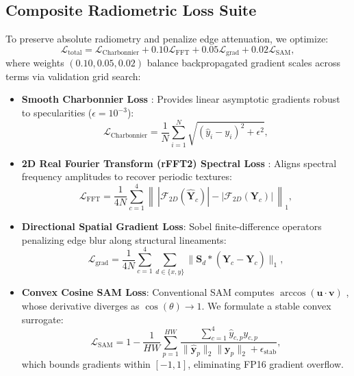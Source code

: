 \documentclass[letterpaper,journal,twoside]{IEEEtran}
\begin{document}
\subsection{Composite Radiometric Loss Suite}
To preserve absolute radiometry and penalize edge attenuation, we optimize:
\begin{equation}
\mathcal{L}_{\text{total}} = \mathcal{L}_{\text{Charbonnier}} + 0.10 \mathcal{L}_{\text{FFT}} + 0.05 \mathcal{L}_{\text{grad}} + 0.02 \mathcal{L}_{\text{SAM}},
\label{eq:total_loss}
\end{equation}
where weights $(0.10, 0.05, 0.02)$ balance backpropagated gradient scales across terms via validation grid search:
\begin{itemize}[leftmargin=*,itemsep=0.8pt,topsep=1.0pt,parsep=0pt]
    \item \textbf{Smooth Charbonnier Loss} \cite{charbonnier1997deterministic}: Provides linear asymptotic gradients robust to specularities ($\epsilon = 10^{-3}$):
    \begin{equation}
    \mathcal{L}_{\text{Charbonnier}} = \frac{1}{N} \sum_{i=1}^N \sqrt{(\hat{y}_i - y_i)^2 + \epsilon^2},
    \label{eq:charbonnier}
    \end{equation}
    \item \textbf{2D Real Fourier Transform (rFFT2) Spectral Loss} \cite{jiang2021focal}: Aligns spectral frequency amplitudes to recover periodic textures:
    \begin{equation}
    \mathcal{L}_{\text{FFT}} = \frac{1}{4N} \sum_{c=1}^4 \left\| \, |\mathcal{F}_{2D}(\hat{\mathbf{Y}}_c)| - |\mathcal{F}_{2D}(\mathbf{Y}_c)| \, \right\|_1,
    \label{eq:fft_loss}
    \end{equation}
    \item \textbf{Directional Spatial Gradient Loss}: Sobel finite-difference operators penalizing edge blur along structural lineaments:
    \begin{equation}
    \mathcal{L}_{\text{grad}} = \frac{1}{4N} \sum_{c=1}^4 \sum_{d \in \{x, y\}} \|\mathbf{S}_d * (\hat{\mathbf{Y}}_c - \mathbf{Y}_c)\|_1,
    \label{eq:grad_loss}
    \end{equation}
    \item \textbf{Convex Cosine SAM Loss}: Conventional SAM computes $\arccos(\mathbf{u} \cdot \mathbf{v})$ \cite{kruse1993spectral}, whose derivative diverges as $\cos(\theta) \to 1$. We formulate a stable convex surrogate:
    \begin{equation}
    \mathcal{L}_{\text{SAM}} = 1 - \frac{1}{HW} \sum_{p=1}^{HW} \frac{\sum_{c=1}^4 \hat{y}_{c, p} y_{c, p}}{\|\hat{\mathbf{y}}_p\|_2 \|\mathbf{y}_p\|_2 + \epsilon_{\text{stab}}},
    \label{eq:sam_loss}
    \end{equation}
    which bounds gradients within $[-1, 1]$, eliminating FP16 gradient overflow.
\end{itemize}
\end{document}
